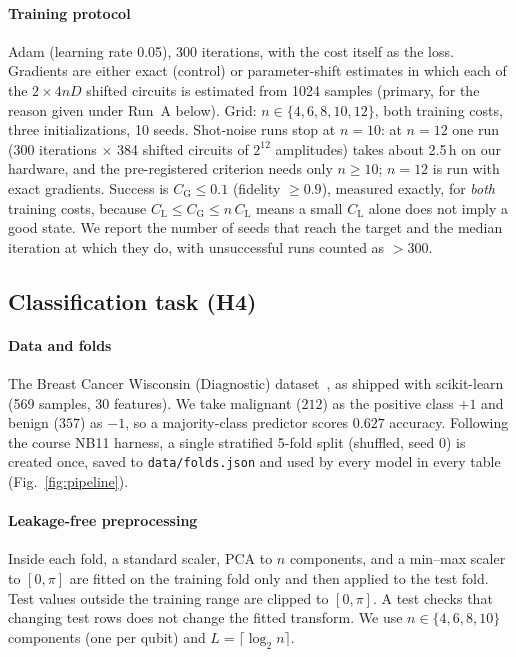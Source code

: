 \documentclass[conference]{IEEEtran}
\newcommand{\CG}{C_{\mathrm{G}}}
\newcommand{\CL}{C_{\mathrm{L}}}
\begin{document}
\paragraph*{Training protocol} Adam (learning rate 0.05), 300 iterations, with
the cost itself as the loss. Gradients are either exact (control) or
parameter-shift estimates in which each of the $2\times4nD$ shifted circuits is
estimated from 1024 samples (primary, for the reason given under Run~A below).
Grid: $n\in\{4,6,8,10,12\}$, both training costs, three initializations, 10
seeds. Shot-noise runs stop at $n=10$: at $n=12$ one run (300 iterations
$\times$ 384 shifted circuits of $2^{12}$ amplitudes) takes about 2.5\,h on our
hardware, and the pre-registered criterion needs only $n\ge10$; $n=12$ is run
with exact gradients.
Success is $\CG\le0.1$ (fidelity $\ge0.9$), measured exactly, for \emph{both}
training costs, because $\CL\le\CG\le n\,\CL$ means a small $\CL$ alone does not
imply a good state. We report the number of seeds that reach the target and the
median iteration at which they do, with unsuccessful runs counted as
$>300$.

\subsection{Classification task (H4)}
\paragraph*{Data and folds} The Breast Cancer Wisconsin (Diagnostic)
dataset~\cite{street1993}, as shipped with scikit-learn~\cite{pedregosa2011}
(569 samples, 30 features). We take malignant ($212$) as the positive class
$+1$ and benign ($357$) as $-1$, so a majority-class predictor scores $0.627$
accuracy. Following the course NB11 harness, a single stratified 5-fold split
(shuffled, seed 0) is created once, saved to \texttt{data/folds.json} and
used by every model in every table (Fig.~\ref{fig:pipeline}).

\paragraph*{Leakage-free preprocessing} Inside each fold, a standard scaler,
PCA to $n$ components, and a min--max scaler to $[0,\pi]$ are fitted on the
training fold only and then applied to the test fold. Test values outside the
training range are clipped to $[0,\pi]$. A test checks that changing test rows
does not change the fitted transform. We use $n\in\{4,6,8,10\}$ components
(one per qubit) and $L=\lceil\log_2 n\rceil$.
\end{document}
